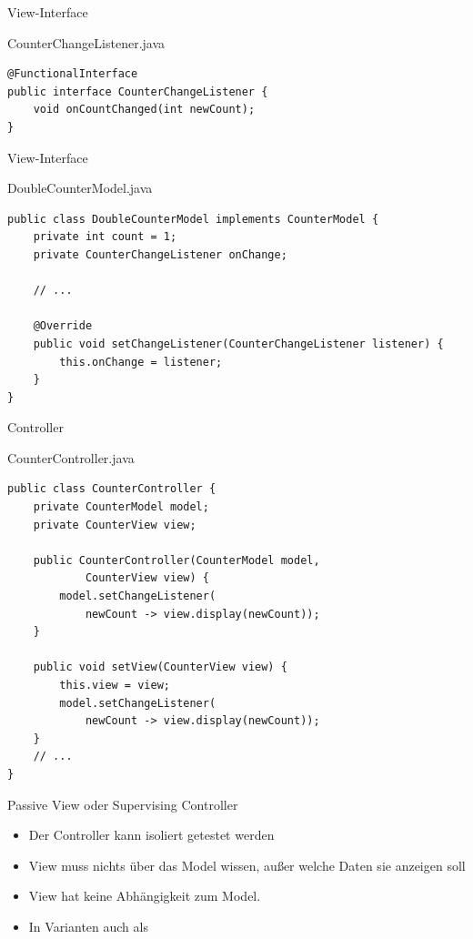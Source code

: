 \begin{frame}[fragile]{View-Interface}
	\begin{exampleblock}{CounterChangeListener.java}
 		\begin{lstlisting}
@FunctionalInterface
public interface CounterChangeListener {
	void onCountChanged(int newCount);
}
 		\end{lstlisting}
 	\end{exampleblock}
\end{frame}

\begin{frame}[fragile]{View-Interface}
	\begin{exampleblock}{DoubleCounterModel.java}
 		\begin{lstlisting}
public class DoubleCounterModel implements CounterModel {
    private int count = 1;
    private CounterChangeListener onChange;

    // ...
	
	@Override
	public void setChangeListener(CounterChangeListener listener) {
		this.onChange = listener;
	}
}
 		\end{lstlisting}
 	\end{exampleblock}
\end{frame}

\begin{frame}[fragile]{Controller}
	\begin{exampleblock}{CounterController.java}
 		\begin{lstlisting}
public class CounterController {
    private CounterModel model;
    private CounterView view;

    public CounterController(CounterModel model, 
    		CounterView view) {
        model.setChangeListener(
        	newCount -> view.display(newCount)); 
    }
    
    public void setView(CounterView view) {
		this.view = view;
		model.setChangeListener(
			newCount -> view.display(newCount)); 
	}
    // ...
}
 		\end{lstlisting}
 	\end{exampleblock}
\end{frame}

\begin{frame}{Passive View oder Supervising Controller}
	\begin{itemize}
	  \item Der Controller kann isoliert getestet werden
	  \item View muss nichts über das Model wissen, außer welche Daten sie anzeigen soll
	  \item View hat keine Abhängigkeit zum Model.
	  \item In Varianten auch als 
	\end{itemize}
\end{frame}


